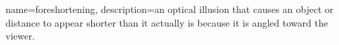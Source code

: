 {
  name=foreshortening,
  description={an optical illusion that causes an object or distance
  to appear shorter than it actually is because it is angled toward the
  viewer.}
}
